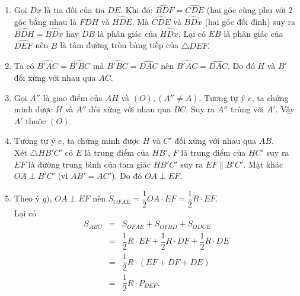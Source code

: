 \begin{bt}
{\begin{enumerate}
{}
			\item Gọi $Dx$ là tia đối của tia $DE$. Khi đó: $\widehat{BDF} = \widehat{CDE}$ (hai góc cùng phụ với 2 góc bằng nhau là $\widehat{FDH}$ và $\widehat{HDE}$. Mà $\widehat{CDE}$ và $\widehat{BDx}$ (hai góc đối đỉnh) suy ra $\widehat{BDH} = \widehat{BDx}$ hay $DB$ là phân giác của $\widehat{HDx}$. Lại có $EB$ là phân giác của $\widehat{DEF}$ nên $B$ là tâm đường tròn bàng tiếp của $\triangle DEF.$
			\item  Ta có $\widehat{B'AC} = \widehat{B'BC}$ mà $\widehat{B'BC} = \widehat{DAC}$ nên $\widehat{B'AC} = \widehat{DAC}$. Do đó $H$ và $B'$ đối xứng với nhau qua $AC.$
			\item Gọi $A''$ là giao điểm của $AH$ và $\left( O \right), \left( A'' \neq A \right)$. Tương tự ý $e$, ta chứng minh được $H$ và $A''$ đối xứng với nhau qua $BC$. Suy ra $A''$ trùng với $A'$. Vậy $A'$ thuộc $\left( O \right)$.
			\item  Tương tự ý $e$, ta chứng minh được $H$ và $C'$ đối xứng với nhau qua $AB.$ \\
			Xét $\triangle HB'C'$ có $E$ là trung điểm của $HB'$, $F$ là trung điểm của $HC'$ suy ra $EF$ là đường trung bình của tam giác $HB'C'$ suy ra $EF \parallel B'C'$. Mặt khác $OA \perp B'C'$ (vì $AB' = AC'$). Do đó $OA \perp EF.$
			\item Theo ý $g)$, $OA \perp EF$ nên $S_{OFAE} = \dfrac{1}{2} OA \cdot EF = \dfrac{1}{2} R \cdot EF $. \\
			Lại có 
			{\allowdisplaybreaks
				\begin{eqnarray*}
					S_{ABC} & = & S_{OFAE} + S_{OFBD} + S_{ODCE} \\
					&  = & \dfrac{1}{2} R \cdot EF + \dfrac{1}{2} R \cdot DF + \dfrac{1}{2} R \cdot DE \\
					& = & \dfrac{1}{2} R \cdot \left( EF + DF + DE \right) \\
					& = & \dfrac{1}{2} R \cdot P_{DEF}.
			\end{eqnarray*}}
		\end{enumerate}	
	}
\end{bt}

